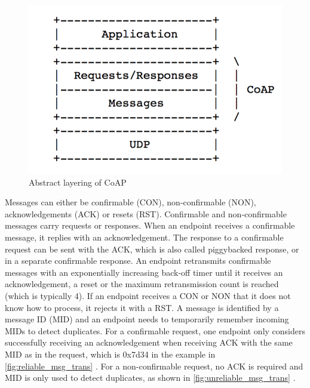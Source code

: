 \begin{figure}[!htbp]
\centering
\includegraphics[scale = 0.55]{coap_layer.png}
\caption{Abstract layering of CoAP}
\label{fig:coap_layer}
\end{figure}

Messages can either be confirmable (CON), non-confirmable (NON), acknowledgements (ACK) or resets (RST). Confirmable and non-confirmable messages carry requests or responses. When an endpoint receives a confirmable message, it replies with an acknowledgement. The response to a confirmable request can be sent with the ACK, which is also called piggybacked response, or in a separate confirmable response. An endpoint retransmits confirmable messages with an exponentially increasing back-off timer until it receives an acknowledgement, a reset or the maximum retransmission count is reached (which is typically 4). If an endpoint receives a CON or NON that it does not know how to process, it rejects it with a RST. A message is identified by a message ID (MID) and an endpoint needs to temporarily remember incoming MIDs to detect duplicates. For a confirmable request, one endpoint only considers successfully receiving an acknowledgement when receiving ACK with the same MID as in the request, which is 0x7d34 in the example in \autoref{fig:reliable_msg_trans} \cite{coap_protocol}. For a non-confirmable request, no ACK is required and MID is only used to detect duplicates, as shown in \autoref{fig:unreliable_msg_trans} \cite{coap_protocol}.

